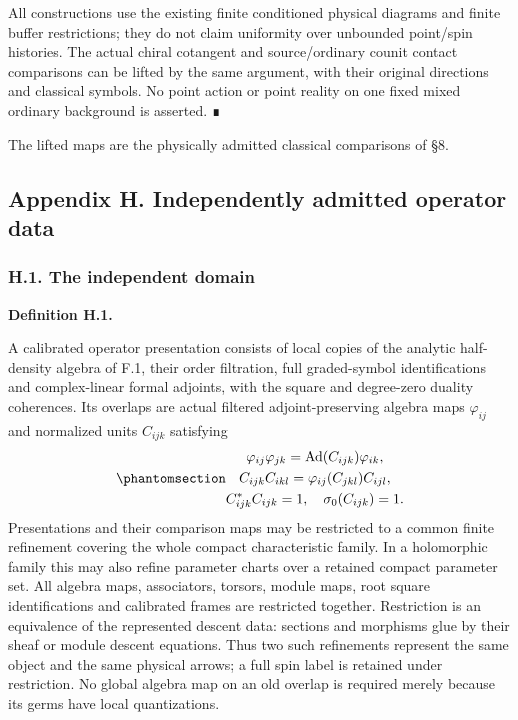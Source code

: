 \documentclass[
  english,
  11pt,
  reqno]{amsart}
\makeatletter
\newcommand{\pandocstatementheading}[1]{%
  \par\addpenalty{\@beginparpenalty}%
  \addvspace{.5\baselineskip plus .2\baselineskip minus .2\baselineskip}%
  {\normalfont\bfseries #1\par}%
  \nobreak\@afterindenttrue\@afterheading
}
\makeatother
\begin{document}
All constructions use the existing finite conditioned physical diagrams
and finite buffer restrictions; they do not claim uniformity over
unbounded point/spin histories. The actual chiral cotangent and
source/ordinary counit contact comparisons can be lifted by the same
argument, with their original directions and classical symbols. No point
action or point reality on one fixed mixed ordinary background is
asserted. ∎

The lifted maps are the physically admitted classical comparisons of §8.

\protect{}\label{app:gg-independent-operator-domain}

\subsection{Appendix H. Independently admitted operator
data}\label{appendix-h.-independently-admitted-operator-data}

\protect{}\label{sec:gg-independent-op-definition}

\subsubsection{H.1. The independent
domain}\label{h.1.-the-independent-domain}

\pandocstatementheading{\protect{}\label{def:gg-independent-op-domain}Definition H.1.}

A calibrated operator presentation consists of local copies of the
analytic half-density algebra of F.1, their order filtration, full
graded-symbol identifications and complex-linear formal adjoints, with
the square and degree-zero duality coherences. Its overlaps are actual
filtered adjoint-preserving algebra maps \(\varphi_{ij}\) and normalized
units \(C_{ijk}\) satisfying
\begin{equation}\protect\phantomsection\label{eq:gg-independent-op-algebroid}{\begin{gathered}
\varphi_{ij}\varphi_{jk}
   =\operatorname{Ad}(C_{ijk})\varphi_{ik}, \\
C_{ijk}C_{ikl}=\varphi_{ij}(C_{jkl})C_{ijl}, \\
C_{ijk}^*C_{ijk}=1,\quad \sigma_0(C_{ijk})=1.
\end{gathered}}\end{equation} Presentations and their comparison maps may be
restricted to a common finite refinement covering the whole compact
characteristic family. In a holomorphic family this may also refine
parameter charts over a retained compact parameter set. All algebra
maps, associators, torsors, module maps, root square identifications and
calibrated frames are restricted together. Restriction is an equivalence
of the represented descent data: sections and morphisms glue by their
sheaf or module descent equations. Thus two such refinements represent
the same object and the same physical arrows; a full spin label is
retained under restriction. No global algebra map on an old overlap is
required merely because its germs have local quantizations.
\end{document}
